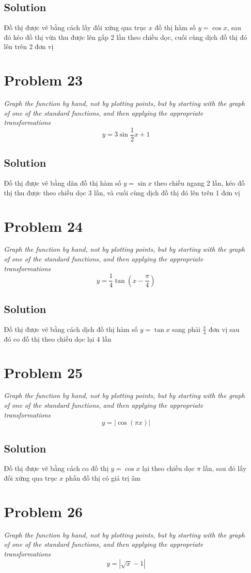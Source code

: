 \documentclass[11pt]{article}
\newcommand{\soln}{\subsection*}
\newcommand{\qn}{\textit}
\begin{document}
\soln{Solution}
Đồ thị được vẽ bằng cách lấy đối xứng qua trục $x$ đồ thị hàm số $y=\cos{x}$, sau đó kéo đồ thị vừa thu được lên gấp 2 lần theo chiều dọc, cuối cùng dịch đồ thị đó lên trên 2 đơn vị

\section*{Problem 23}

\qn{Graph the function by hand, not by plotting points, but by starting with the graph of one of the standard functions, and then applying the appropriate transformations $$y=3\sin{\frac{1}{2}x}+1$$}

\soln{Solution}
Đồ thị được vẽ bằng dãn đồ thị hàm số $y=\sin{x}$ theo chiều ngang 2 lần, kéo đồ thị thu được theo chiều dọc 3 lần, và cuối cùng dịch đồ thị đó lên trên 1 đơn vị

\section*{Problem 24}

\qn{Graph the function by hand, not by plotting points, but by starting with the graph of one of the standard functions, and then applying the appropriate transformations $$y=\frac{1}{4}\tan(x-\frac{\pi}{4})$$}

\soln{Solution}
Đồ thị được vẽ bằng cách dịch đồ thị hàm số $y=\tan{x}$ sang phải $\frac{\pi}{4}$ đơn vị sau đó co đồ thị theo chiều dọc lại 4 lần

\section*{Problem 25}

\qn{Graph the function by hand, not by plotting points, but by starting with the graph of one of the standard functions, and then applying the appropriate transformations $$y=|\cos(\pi x)|$$}

\soln{Solution}
Đồ thị được vẽ bằng cách co đồ thị $y=\cos{x}$ lại theo chiều dọc $\pi$ lần, sau đó lấy đối xứng qua trục $x$ phần đồ thị có giá trị âm


\section*{Problem 26}

\qn{Graph the function by hand, not by plotting points, but by starting with the graph of one of the standard functions, and then applying the appropriate transformations $$y=|\sqrt{x}-1|$$}
\end{document}
